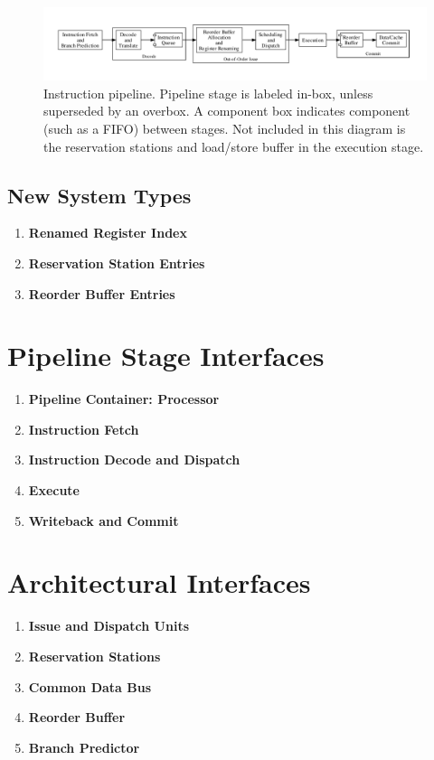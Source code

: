 \documentclass[12pt]{article}
\begin{document}
\begin{figure}[h]
    \centering
    \includegraphics[width=1.1\textwidth]{figures/pipeline.pdf}
    \caption{Instruction pipeline. Pipeline stage is labeled in-box, unless superseded by an overbox. A component box indicates component (such as a FIFO) between stages. Not included in this diagram is the reservation stations and load/store buffer in the execution stage.\label{fig:pipeline}}
\end{figure}

\subsection{New System Types}

\begin{enumerate}
    \item \textbf{Renamed Register Index}
    \item \textbf{Reservation Station Entries}
    \item \textbf{Reorder Buffer Entries}
\end{enumerate}

\section{Pipeline Stage Interfaces}

\begin{enumerate}
    \item \textbf{Pipeline Container: Processor}
    \item \textbf{Instruction Fetch}
    \item \textbf{Instruction Decode and Dispatch}
    \item \textbf{Execute}
    \item \textbf{Writeback and Commit}
\end{enumerate}

\section{Architectural Interfaces}

\begin{enumerate}
    \item \textbf{Issue and Dispatch Units}
    \item \textbf{Reservation Stations}
    \item \textbf{Common Data Bus}
    \item \textbf{Reorder Buffer}
    \item \textbf{Branch Predictor}
\end{enumerate}
    
\end{document}
